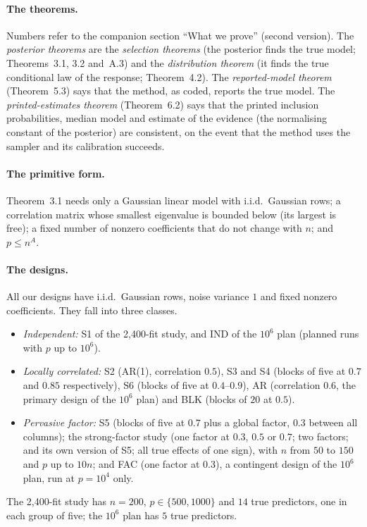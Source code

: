\documentclass[11pt]{article}
\begin{document}
\paragraph{The theorems.} Numbers refer to the companion section ``What we prove'' (second version). The \emph{posterior theorems} are
the \emph{selection theorems} (the posterior finds the true model; Theorems~3.1, 3.2 and~A.3) and the
\emph{distribution theorem} (it finds the true conditional law of the response; Theorem~4.2). The \emph{reported-model
theorem} (Theorem~5.3) says that the method, as coded, reports the true model. The \emph{printed-estimates theorem}
(Theorem~6.2) says that the printed inclusion probabilities, median model and estimate of the evidence (the
normalising constant of the posterior) are consistent, on the event that the method uses the sampler and its
calibration succeeds.

\paragraph{The primitive form.} Theorem~3.1 needs only a Gaussian linear model with i.i.d.\ Gaussian rows; a
correlation matrix whose smallest eigenvalue is bounded below (its largest is free); a fixed number of nonzero
coefficients that do not change with $n$; and $p\le n^A$.

\paragraph{The designs.} All our designs have i.i.d.\ Gaussian rows, noise variance $1$ and fixed nonzero coefficients.
They fall into three classes.
\begin{itemize}[leftmargin=1.5em,itemsep=1pt]
  \item \emph{Independent:} S1 of the 2,400-fit study, and IND of the $10^6$ plan (planned runs with $p$ up to $10^6$).
  \item \emph{Locally correlated:} S2 (AR(1), correlation $0.5$), S3 and S4 (blocks of five at $0.7$ and $0.85$ respectively), S6 (blocks of
    five at $0.4$--$0.9$), AR (correlation $0.6$, the primary design of the $10^6$ plan) and BLK (blocks of $20$ at
    $0.5$).
  \item \emph{Pervasive factor:} S5 (blocks of five at $0.7$ plus a global factor, $0.3$ between all columns); the
    strong-factor study (one factor at $0.3$, $0.5$ or $0.7$; two factors; and its own version of S5; all true effects of
    one sign), with $n$ from $50$ to $150$ and $p$ up to $10n$; and FAC (one factor at $0.3$), a
    contingent design of the $10^6$ plan, run at $p=10^4$ only.
\end{itemize}
The 2,400-fit study has $n=200$, $p\in\{500,1000\}$ and $14$ true predictors, one in each group of five; the $10^6$ plan
has $5$ true predictors.
\end{document}
